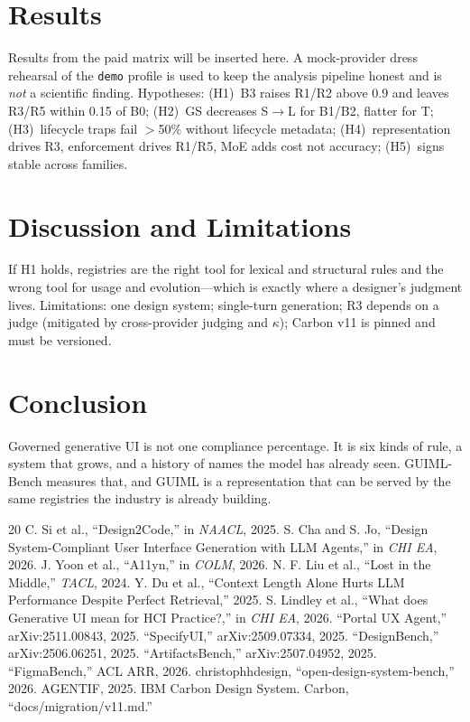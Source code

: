\documentclass[journal]{IEEEtran}
\begin{document}
\section{Results}
Results from the paid matrix will be inserted here. A mock-provider dress rehearsal of the \texttt{demo} profile is used to keep the analysis pipeline honest and is \emph{not} a scientific finding. Hypotheses: (H1)~B3 raises R1/R2 above 0.9 and leaves R3/R5 within 0.15 of B0; (H2)~GS decreases S$\to$L for B1/B2, flatter for T; (H3)~lifecycle traps fail $>$50\% without lifecycle metadata; (H4)~representation drives R3, enforcement drives R1/R5, MoE adds cost not accuracy; (H5)~signs stable across families.

\section{Discussion and Limitations}
If H1 holds, registries are the right tool for lexical and structural rules and the wrong tool for usage and evolution---which is exactly where a designer's judgment lives. Limitations: one design system; single-turn generation; R3 depends on a judge (mitigated by cross-provider judging and $\kappa$); Carbon v11 is pinned and must be versioned.

\section{Conclusion}
Governed generative UI is not one compliance percentage. It is six kinds of rule, a system that grows, and a history of names the model has already seen. GUIML-Bench measures that, and GUIML is a representation that can be served by the same registries the industry is already building.


\begin{thebibliography}{20}
 C. Si et al., ``Design2Code,'' in \emph{NAACL}, 2025.
 S. Cha and S. Jo, ``Design System-Compliant User Interface Generation with LLM Agents,'' in \emph{CHI EA}, 2026.
 J. Yoon et al., ``A11yn,'' in \emph{COLM}, 2026.
 N. F. Liu et al., ``Lost in the Middle,'' \emph{TACL}, 2024.
 Y. Du et al., ``Context Length Alone Hurts LLM Performance Despite Perfect Retrieval,'' 2025.
 S. Lindley et al., ``What does Generative UI mean for HCI Practice?,'' in \emph{CHI EA}, 2026.
 ``Portal UX Agent,'' arXiv:2511.00843, 2025.
 ``SpecifyUI,'' arXiv:2509.07334, 2025.
 ``DesignBench,'' arXiv:2506.06251, 2025.
 ``ArtifactsBench,'' arXiv:2507.04952, 2025.
 ``FigmaBench,'' ACL ARR, 2026.
 christophhdesign, ``open-design-system-bench,'' 2026.
 AGENTIF, 2025.
 IBM Carbon Design System.
 Carbon, ``docs/migration/v11.md.''
\end{thebibliography}
\end{document}
